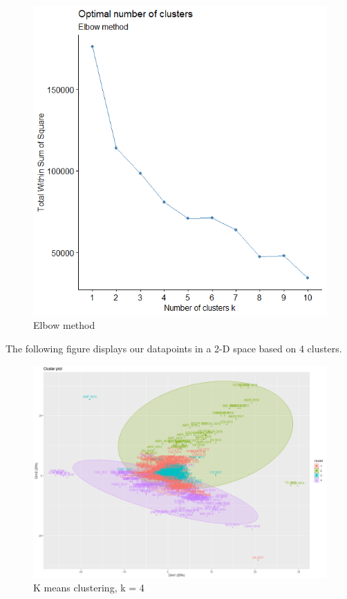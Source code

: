 \documentclass[11pt,]{article}
\begin{document}
\begin{figure}

{\centering \includegraphics[width=0.6\linewidth,height=0.4\textheight]{unsupervised_elbow} 

}

\caption{Elbow method}\label{fig:elbow}
\end{figure}

The following figure displays our datapoints in a 2-D space based on 4
clusters.

\begin{landscape}
\begin{figure}
\includegraphics[width=1\linewidth,height=1\textheight]{cluster_image} \caption{K means clustering, k = 4}\label{fig:cluster}
\end{figure}
\end{landscape}
\end{document}
